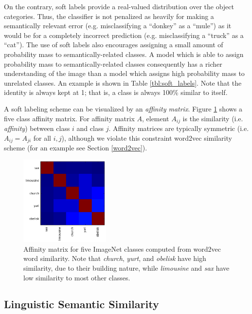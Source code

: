 On the contrary, soft labels provide a real-valued distribution over
the object categories. Thus, the classifier is not penalized as
heavily for making a semantically relevant error (e.g. misclassifying
a ``donkey'' as a ``mule'') as it would be for a completely incorrect
prediction (e.g. misclassifying a ``truck'' as a ``cat''). The use of
soft labels also encourages assigning a small amount of probability
mass to semantically-related classes. A model which is able to assign
probability mass to semantically-related classes consequently has a richer
understanding of the image than a model which assigns high probability mass to
unrelated classes. An example is shown in Table \ref{tbl:soft_labels}.
Note that the identity is always kept at 1; that is, a class is always
100\% similar to itself.

A soft labeling scheme can be visualized by an \emph{affinity matrix}. Figure
\ref{fig:aff-5_1} shows a five class affinity matrix. For affinity matrix $A$,
element $A_{ij}$ is the similarity (i.e. \emph{affinity}) between class $i$ and
class $j$. Affinity matrices are typically symmetric (i.e. $A_{ij} = A_{ji}$ for
all $i, j$), although we violate this constraint word2vec similarity scheme (for
an example see Section \ref{word2vec}).

\begin{figure}[!tb]
  \centering
  \includegraphics[width=0.4\textwidth]{figs/aff-5_1.png}
  \caption{
      Affinity matrix for five ImageNet classes computed from word2vec word
      similarity. Note that \emph{church}, \emph{yurt}, and
      \emph{obelisk} have high similarity, due to their building nature, while
      \emph{limousine} and \emph{sax} have low similarity to most other classes.
  }
  \label{fig:aff-5_1}
\end{figure}

\subsection{Linguistic Semantic Similarity}


